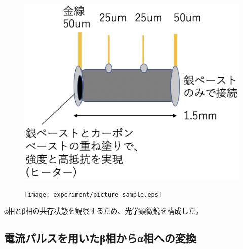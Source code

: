 \begin{figure}[htb]
 \begin{minipage}{\hsize}
    \begin{center}
   \includegraphics[width=0.7\hsize]{experiment/schematics_sample.eps}
  \end{center}
  \caption{}
  \label{fig:schematics_sample}
 \end{minipage}
 \begin{minipage}{\hsize}
     \begin{center}
   \texttt{[image: experiment/picture\_sample.eps]}
  \end{center}
  \caption{}
  \label{fig:picture_sample}
   \end{minipage}
\end{figure}


α相とβ相の共存状態を観察するため、光学顕微鏡を構成した。

\subsection{電流パルスを用いたβ相からα相への変換}

\newpage

